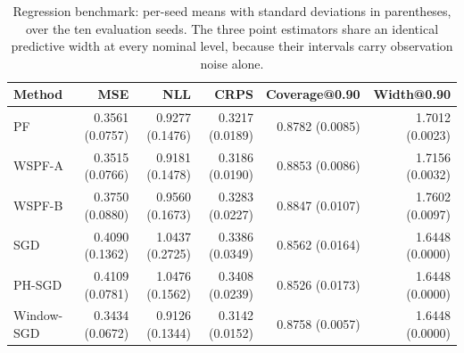 \begin{table}[htbp]
\centering
\footnotesize
\setlength{\tabcolsep}{3pt}
\caption{Regression benchmark: per-seed means with standard deviations in parentheses, over the ten evaluation seeds. The three point estimators share an identical predictive width at every nominal level, because their intervals carry observation noise alone.}
\label{tab:s3_per_seed_sd}
\begin{tabular}{@{}lrrrrr@{}}
\toprule
Method & MSE & NLL & CRPS & Coverage@0.90 & Width@0.90 \\
\midrule
PF & 0.3561 (0.0757) & 0.9277 (0.1476) & 0.3217 (0.0189) & 0.8782 (0.0085) & 1.7012 (0.0023) \\
WSPF-A & 0.3515 (0.0766) & 0.9181 (0.1478) & 0.3186 (0.0190) & 0.8853 (0.0086) & 1.7156 (0.0032) \\
WSPF-B & 0.3750 (0.0880) & 0.9560 (0.1673) & 0.3283 (0.0227) & 0.8847 (0.0107) & 1.7602 (0.0097) \\
SGD & 0.4090 (0.1362) & 1.0437 (0.2725) & 0.3386 (0.0349) & 0.8562 (0.0164) & 1.6448 (0.0000) \\
PH-SGD & 0.4109 (0.0781) & 1.0476 (0.1562) & 0.3408 (0.0239) & 0.8526 (0.0173) & 1.6448 (0.0000) \\
Window-SGD & 0.3434 (0.0672) & 0.9126 (0.1344) & 0.3142 (0.0152) & 0.8758 (0.0057) & 1.6448 (0.0000) \\
\bottomrule
\end{tabular}
\end{table}
